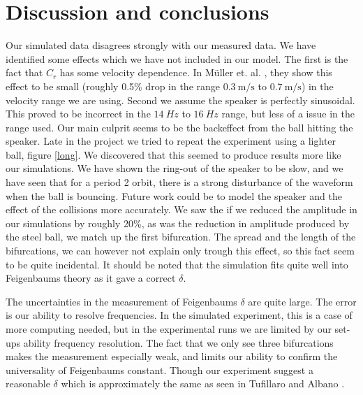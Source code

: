 \documentclass[12pt,oneside,a4paper]{article}
\numberwithin{equation}{section}
\begin{document}
{{{{\section{Discussion and conclusions}
\label{conclusions}
Our simulated data disagrees strongly with our measured data. We have identified some effects which we have not included in our model. The first is the fact that $C_r$ has some velocity dependence. In Müller et. al. \cite{muller}, they show this effect to be small (roughly 0.5\% drop in the range $\SI{0.3}{\meter\per\second}$ to $\SI{0.7}{\meter\per\second}$) in the velocity range we are using. Second we assume the speaker is perfectly sinusoidal. This proved to be incorrect in the $\SI{14}{Hz}$ to $\SI{16}{Hz}$ range, but less of a issue in the range used. Our main culprit seems to be the backeffect from the ball hitting the speaker. Late in the project we tried to repeat the experiment using a lighter ball, figure \ref{long}. We discovered that this seemed to produce results more like our simulations. We have shown the ring-out of the speaker to be slow, and we have seen that for a period 2 orbit, there is a strong disturbance of the waveform when the ball is bouncing. Future work could be to model the speaker and the effect of the collisions more accurately. We saw the if we reduced the amplitude in our simulations by roughly 20\%, as was the reduction in amplitude produced by the steel ball, we match up the first bifurcation. The spread and the length of the bifurcations, we can however not explain only trough this effect, so this fact seem to be quite incidental. It should be noted that the simulation fits quite well into Feigenbaums theory as it gave a correct $\delta$.
	
The uncertainties in the measurement of Feigenbaums $\delta$ are quite large. The error is our ability to resolve frequencies. In the simulated experiment, this is a case of more computing needed, but in the experimental runs we are limited by our set-ups ability frequency resolution. The fact that we only see three bifurcations makes the measurement especially weak, and limits our ability to confirm the universality of Feigenbaums constant. Though our experiment suggest a reasonable $\delta$ which is approximately the same as seen in Tufillaro and Albano \cite{tufillaro}.
\newpage
{}




\newpage
\appendix

}}}}
\end{document}
